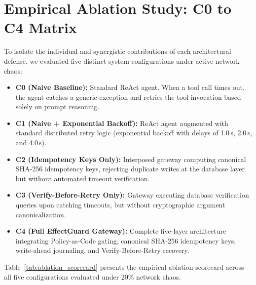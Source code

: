 \section{Empirical Ablation Study: C0 to C4 Matrix}

To isolate the individual and synergistic contributions of each architectural defense, we evaluated five distinct system configurations under active network chaos:
\begin{itemize}
    \item \textbf{C0 (Naive Baseline):} Standard ReAct agent. When a tool call times out, the agent catches a generic exception and retries the tool invocation based solely on prompt reasoning.
    \item \textbf{C1 (Naive + Exponential Backoff):} ReAct agent augmented with standard distributed retry logic (exponential backoff with delays of 1.0\,s, 2.0\,s, and 4.0\,s).
    \item \textbf{C2 (Idempotency Keys Only):} Interposed gateway computing canonical SHA-256 idempotency keys, rejecting duplicate writes at the database layer but without automated timeout verification.
    \item \textbf{C3 (Verify-Before-Retry Only):} Gateway executing database verification queries upon catching timeouts, but without cryptographic argument canonicalization.
    \item \textbf{C4 (Full EffectGuard Gateway):} Complete five-layer architecture integrating Policy-as-Code gating, canonical SHA-256 idempotency keys, write-ahead journaling, and Verify-Before-Retry recovery.
\end{itemize}

Table~\ref{tab:ablation_scorecard} presents the empirical ablation scorecard across all five configurations evaluated under 20\% network chaos.

